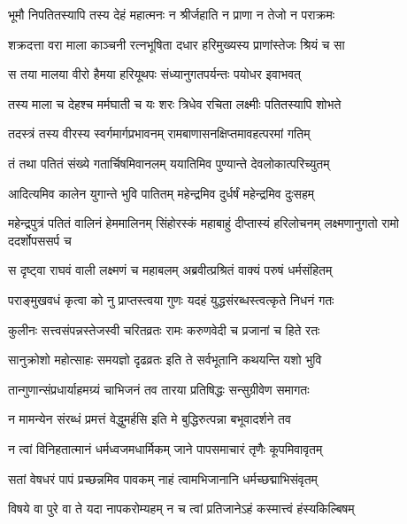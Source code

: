 \twolineshloka
{भूमौ निपतितस्यापि तस्य देहं महात्मनः}
{न श्रीर्जहाति न प्राणा न तेजो न पराक्रमः} %

\twolineshloka
{शक्रदत्ता वरा माला काञ्चनी रत्नभूषिता}
{दधार हरिमुख्यस्य प्राणांस्तेजः श्रियं च सा} %

\twolineshloka
{स तया मालया वीरो हैमया हरियूथपः}
{संध्यानुगतपर्यन्तः पयोधर इवाभवत्} %

\twolineshloka
{तस्य माला च देहश्च मर्मघाती च यः शरः}
{त्रिधेव रचिता लक्ष्मीः पतितस्यापि शोभते} %

\twolineshloka
{तदस्त्रं तस्य वीरस्य स्वर्गमार्गप्रभावनम्}
{रामबाणासनक्षिप्तमावहत्परमां गतिम्} %

\twolineshloka
{तं तथा पतितं संख्ये गतार्चिषमिवानलम्}
{ययातिमिव पुण्यान्ते देवलोकात्परिच्युतम्} %

\twolineshloka
{आदित्यमिव कालेन युगान्ते भुवि पातितम्}
{महेन्द्रमिव दुर्धर्षं महेन्द्रमिव दुःसहम्} %

\threelineshloka
{महेन्द्रपुत्रं पतितं वालिनं हेममालिनम्}
{सिंहोरस्कं महाबाहुं दीप्तास्यं हरिलोचनम्}
{लक्ष्मणानुगतो रामो ददर्शोपससर्प च} %

\twolineshloka
{स दृष्ट्वा राघवं वाली लक्ष्मणं च महाबलम्}
{अब्रवीत्प्रश्रितं वाक्यं परुषं धर्मसंहितम्} %

\twolineshloka
{पराङ्मुखवधं कृत्वा को नु प्राप्तस्त्वया गुणः}
{यदहं युद्धसंरब्धस्त्वत्कृते निधनं गतः} %

\twolineshloka
{कुलीनः सत्त्वसंपन्नस्तेजस्वी चरितव्रतः}
{रामः करुणवेदी च प्रजानां च हिते रतः} %

\twolineshloka
{सानुक्रोशो महोत्साहः समयज्ञो दृढव्रतः}
{इति ते सर्वभूतानि कथयन्ति यशो भुवि} %

\twolineshloka
{तान्गुणान्संप्रधार्याहमग्र्यं चाभिजनं तव}
{तारया प्रतिषिद्धः सन्सुग्रीवेण समागतः} %

\twolineshloka
{न मामन्येन संरब्धं प्रमत्तं वेद्धुमर्हसि}
{इति मे बुद्धिरुत्पन्ना बभूवादर्शने तव} %

\twolineshloka
{न त्वां विनिहतात्मानं धर्मध्वजमधार्मिकम्}
{जाने पापसमाचारं तृणैः कूपमिवावृतम्} %

\twolineshloka
{सतां वेषधरं पापं प्रच्छन्नमिव पावकम्}
{नाहं त्वामभिजानानि धर्मच्छद्माभिसंवृतम्} %

\twolineshloka
{विषये वा पुरे वा ते यदा नापकरोम्यहम्}
{न च त्वां प्रतिजानेऽहं कस्मात्त्वं हंस्यकिल्बिषम्} %

